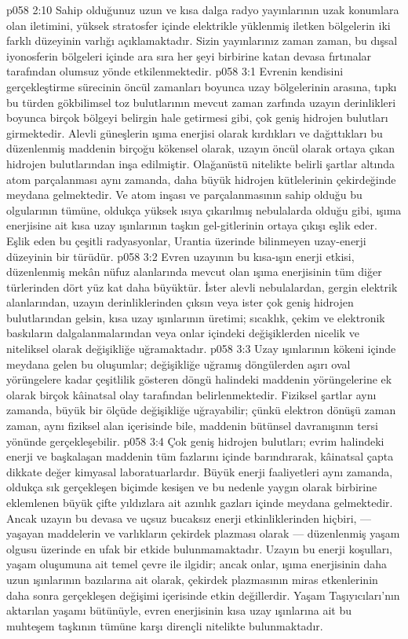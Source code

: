 \vs p058 2:10 Sahip olduğunuz uzun ve kısa dalga radyo yayınlarının uzak konumlara olan iletimini, yüksek stratosfer içinde elektrikle yüklenmiş iletken bölgelerin iki farklı düzeyinin varlığı açıklamaktadır. Sizin yayınlarınız zaman zaman, bu dışsal iyonosferin bölgeleri içinde ara sıra her şeyi birbirine katan devasa fırtınalar tarafından olumsuz yönde etkilenmektedir.
\vs p058 3:1 Evrenin kendisini gerçekleştirme sürecinin öncül zamanları boyunca uzay bölgelerinin arasına, tıpkı bu türden gökbilimsel toz bulutlarının mevcut zaman zarfında uzayın derinlikleri boyunca birçok bölgeyi belirgin hale getirmesi gibi, çok geniş hidrojen bulutları girmektedir. Alevli güneşlerin ışıma enerjisi olarak kırdıkları ve dağıttıkları bu düzenlenmiş maddenin birçoğu kökensel olarak, uzayın öncül olarak ortaya çıkan hidrojen bulutlarından inşa edilmiştir. Olağanüstü nitelikte belirli şartlar altında atom parçalanması aynı zamanda, daha büyük hidrojen kütlelerinin çekirdeğinde meydana gelmektedir. Ve atom inşası ve parçalanmasının sahip olduğu bu olgularının tümüne, oldukça yüksek ısıya çıkarılmış nebulalarda olduğu gibi, ışıma enerjisine ait kısa uzay ışınlarının taşkın gel\hyp{}gitlerinin ortaya çıkışı eşlik eder. Eşlik eden bu çeşitli radyasyonlar, Urantia üzerinde bilinmeyen uzay\hyp{}enerji düzeyinin bir türüdür.
\vs p058 3:2 Evren uzayının bu kısa\hyp{}ışın enerji etkisi, düzenlenmiş mekân nüfuz alanlarında mevcut olan ışıma enerjisinin tüm diğer türlerinden dört yüz kat daha büyüktür. İster alevli nebulalardan, gergin elektrik alanlarından, uzayın derinliklerinden çıksın veya ister çok geniş hidrojen bulutlarından gelsin, kısa uzay ışınlarının üretimi; sıcaklık, çekim ve elektronik baskıların dalgalanmalarından veya onlar içindeki değişiklerden nicelik ve niteliksel olarak değişikliğe uğramaktadır.
\vs p058 3:3 Uzay ışınlarının kökeni içinde meydana gelen bu oluşumlar; değişikliğe uğramış döngülerden aşırı oval yörüngelere kadar çeşitlilik gösteren döngü halindeki maddenin yörüngelerine ek olarak birçok kâinatsal olay tarafından belirlenmektedir. Fiziksel şartlar aynı zamanda, büyük bir ölçüde değişikliğe uğrayabilir; çünkü elektron dönüşü zaman zaman, aynı fiziksel alan içerisinde bile, maddenin bütünsel davranışının tersi yönünde gerçekleşebilir.
\vs p058 3:4 Çok geniş hidrojen bulutları; evrim halindeki enerji ve başkalaşan maddenin tüm fazlarını içinde barındırarak, kâinatsal çapta dikkate değer kimyasal laboratuarlardır. Büyük enerji faaliyetleri aynı zamanda, oldukça sık gerçekleşen biçimde kesişen ve bu nedenle yaygın olarak birbirine eklemlenen büyük çifte yıldızlara ait azınlık gazları içinde meydana gelmektedir. Ancak uzayın bu devasa ve uçsuz bucaksız enerji etkinliklerinden hiçbiri, --- yaşayan maddelerin ve varlıkların çekirdek plazması olarak --- düzenlenmiş yaşam olgusu üzerinde en ufak bir etkide bulunmamaktadır. Uzayın bu enerji koşulları, yaşam oluşumuna ait temel çevre ile ilgidir; ancak onlar, ışıma enerjisinin daha uzun ışınlarının bazılarına ait olarak, çekirdek plazmasının miras etkenlerinin daha sonra gerçekleşen değişimi içerisinde etkin değillerdir. Yaşam Taşıyıcıları’nın aktarılan yaşamı bütünüyle, evren enerjisinin kısa uzay ışınlarına ait bu muhteşem taşkının tümüne karşı dirençli nitelikte bulunmaktadır.
